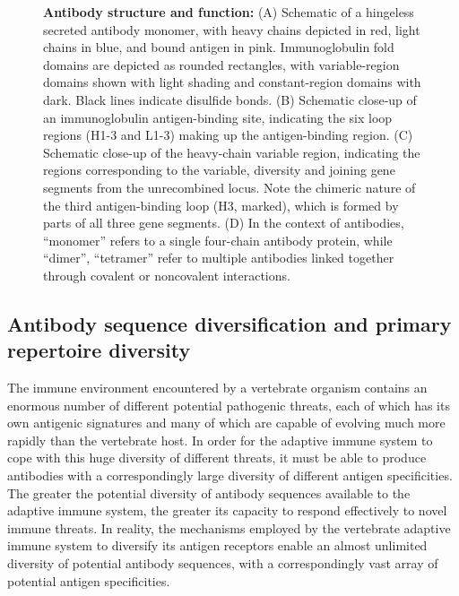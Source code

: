 \begin{figure}
\caption[Antibody structure and function]{\textbf{Antibody structure and function:} (A) Schematic of a hingeless secreted antibody monomer, with heavy chains depicted in red, light chains in blue, and bound antigen in pink. Immunoglobulin fold domains are depicted as rounded rectangles, with variable-region domains shown with light shading and constant-region domains with dark. Black lines indicate disulfide bonds. (B) Schematic close-up of an immunoglobulin antigen-binding site, indicating the six loop regions (H1-3 and L1-3) making up the antigen-binding region. (C) Schematic close-up of the heavy-chain variable region, indicating the regions corresponding to the variable, diversity and joining gene segments from the unrecombined \igh{} locus. Note the chimeric nature of the third antigen-binding loop (H3, marked), which is formed by parts of all three gene segments. (D) In the context of antibodies, ``monomer'' refers to a single four-chain antibody protein, while ``dimer'', ``tetramer'' \etc refer to multiple antibodies linked together through covalent or noncovalent interactions.}
\label{fig:intro-antibody-structure}
\end{figure}

\subsection{Antibody sequence diversification and primary repertoire diversity}
\label{sec:intro_immunity_primary}


The immune environment encountered by a vertebrate organism contains an enormous number of different potential pathogenic threats, each of which has its own antigenic signatures and many of which are capable of evolving much more rapidly than the vertebrate host. In order for the adaptive immune system to cope with this huge diversity of different threats, it must be able to produce antibodies with a correspondingly large diversity of different antigen specificities. The greater the potential diversity of antibody sequences available to the adaptive immune system, the greater its capacity to respond effectively to novel immune threats. In reality, the mechanisms employed by the vertebrate adaptive immune system to diversify its antigen receptors enable an almost unlimited diversity of potential antibody sequences, with a correspondingly vast array of potential antigen specificities.

